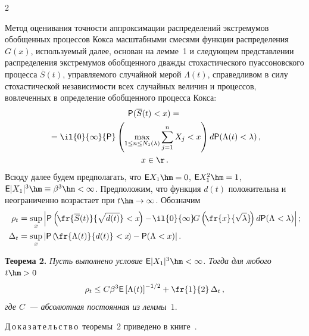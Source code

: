 \begin{multicols}{2}
\smallskip

Метод оценивания точности аппроксимации распределений экстремумов
обобщенных процессов Кокса масштабными смесями функции распределения
$G(x)$, используемый далее, основан на лемме~1 и следующем
представлении распределения экстремумов обобщенного дважды
стохастического пуассоновского процесса $\overline S(t)$,
управляемого случайной мерой $\Lambda(t)$, справедливом в силу
стохастической независимости всех случайных величин и процессов,
вовлеченных в определение обобщенного процесса Кокса: 
\begin{multline*}
{\sf P}(\overline S(t)<x)={}\\
{}=\il{0}{\infty}{\sf P}\left(\max\limits_{1\le n\le
N_1(\lambda)}\sum\limits_{j=1}^{n}X_j<x\right)
d{\sf P}(\Lambda(t)<\lambda)\,,\\
x\in\r\,.
\end{multline*}
Всюду далее будем предполагать, что ${\sf E}X_1\hm=0$, ${\sf
E}X_1^2\hm=1$, ${\sf E}|X_1|^3\hm\equiv\beta^3\hm<\infty$. Предположим, что
функция $d(t)$ положительна и неограниченно возрастает при
$t\hm\to\infty$. Обозначим
\begin{align*}
\rho_t&=\sup\limits_x\left\vert{\sf
P}\left(\!\fr{\overline
S(t)}{\sqrt{d(t)}}<x\!\right)-\!\il{0}{\infty}\!G\left(\!\fr{x}{\sqrt{\lambda}}\!\right)d{\sf
P}(\Lambda<\lambda)\right\vert;\\
\Delta_t&=\sup\limits_x\left\vert{\sf P}\left(\!\fr{\Lambda(t)}{d(t)}<x\!\right)-{\sf
P}(\Lambda<x)\right\vert.
\end{align*}

\smallskip

\noindent
\textbf{Теорема 2.} \textit{Пусть выполнено условие ${\sf
E}|X_1|^3\hm<\infty$. Тогда для любого $t\hm>0$ 
$$
\rho_t\le C\beta^3{\sf E}\left[\Lambda(t)\right]^{-1/2}+
\fr{1}{2}\,\Delta_t\,,
$$ 
где $C$~--- абсолютная постоянная из леммы~$1$}.

\smallskip

\noindent
Д\,о\,к\,а\,з\,а\,т\,е\,л\,ь\,с\,т\,в\,о~теоремы~2 приведено в 
книге~\cite{KorolevSokolov2008}.

\smallskip


\end{multicols}
